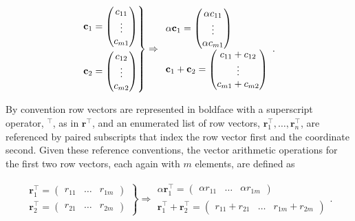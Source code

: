\documentclass[12pt, twoside, draft]{article}
\begin{document}
\begin{equation}\label{eq:vector_arithmetic_column}
\begin{rcases}
\mathbf{c}_1 = \begin{pmatrix} c_{11} \\ \vdots \\ c_{m1} \end{pmatrix} \\
\mathbf{c}_2 = \begin{pmatrix} c_{12} \\ \vdots \\ c_{m2} \end{pmatrix}
\end{rcases}
\Rightarrow 
\begin{array}{l}
\alpha \mathbf{c}_1 = \begin{pmatrix} \alpha c_{11} \\ \vdots \\ \alpha c_{m1} \end{pmatrix} \\
\mathbf{c}_1 + \mathbf{c}_2 = \begin{pmatrix} c_{11} + c_{12} \\ \vdots \\ c_{m1} + c_{m2} \end{pmatrix}
\end{array}.
\end{equation}

By convention row vectors are represented in boldface with a superscript operator, $^\top$, as in $\mathbf{r}^\top$, and an enumerated list of row vectors, $\mathbf{r}_1^\top, \ldots, \mathbf{r}_n^\top$, are referenced by paired subscripts that index the row vector first and the coordinate second.  Given these reference conventions, the vector arithmetic operations for the first two row vectors, each again with $m$ elements, are defined as

\begin{align}\label{eq:vector_arithmetic_row}
\left. \begin{array}{r}
\mathbf{r}_1^\top = \begin{pmatrix} r_{11} & \ldots & r_{1m} \end{pmatrix} \\
\mathbf{r}_2^\top = \begin{pmatrix} r_{21} & \ldots & r_{2m} \end{pmatrix}
\end{array}
\right\} \Rightarrow 
\begin{array}{l}
\alpha \mathbf{r}_1^\top = \begin{pmatrix} \alpha r_{11} & \ldots & \alpha r_{1m} \end{pmatrix} \\
\mathbf{r}_1^\top + \mathbf{r}_2^\top = \begin{pmatrix} r_{11} + r_{21} & \ldots & r_{1m} + r_{2m} \end{pmatrix}
\end{array} .
\end{align}
\end{document}
